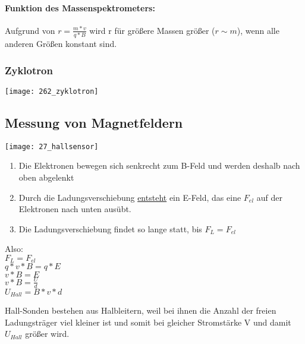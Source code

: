\paragraph{Funktion des Massenspektrometers:} Aufgrund von $r=\frac{m \ast v}{q \ast B}$ wird r für größere Massen größer ($r \sim m$), wenn alle anderen Größen konstant sind.

\subsubsection{Zyklotron}
\texttt{[image: 262\_zyklotron]}

\subsection{Messung von Magnetfeldern}
\texttt{[image: 27\_hallsensor]}\\

\begin{enumerate}
	\item Die Elektronen bewegen sich senkrecht zum B-Feld und werden deshalb nach oben abgelenkt
	\item Durch die Ladungsverschiebung \underline{entsteht} ein E-Feld, das eine $F_{el}$ auf der Elektronen nach unten ausübt.
	\item Die Ladungsverschiebung findet so lange statt, bis $F_L = F_{el}$
\end{enumerate}

Also: 
\vspace{1mm} \\
$F_L = F_{el}$
\vspace{1mm} \\
$ q \ast v \ast B = q \ast E $
\vspace{1mm} \\
$ v \ast B = E $
\vspace{1mm} \\
$ v \ast B = \frac{U}{d} $
\vspace{1mm} \\
$ U_{Hall} = B \ast v \ast d $
\vspace{5mm} 

Hall-Sonden bestehen aus Halbleitern, weil bei ihnen die Anzahl der freien Ladungsträger viel kleiner ist und somit bei gleicher Stromstärke V und damit $U_{Hall}$ größer wird.
